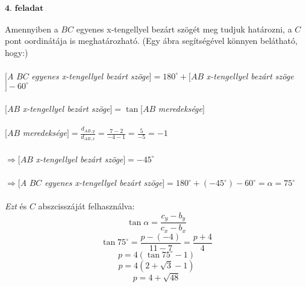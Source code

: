 \documentclass[a4paper,12pt]{article}
\begin{document}
\underline{\textit{$\textbf{4. feladat} $}}
\\
\\ Amennyiben a $BC$ egyenes x-tengellyel bezárt szögét meg tudjuk határozni, a $C$ pont oordinátája is meghatározható. (Egy ábra segítségével könnyen belátható, hogy:)
\\
\\ $[$\textit{A} $BC$ \textit{egyenes x-tengellyel bezárt szöge}$] = 180^{\circ} + [AB$ \textit{x-tengellyel bezárt szöge}$] - 60^{\circ}$
\\
\\ $[AB$ \textit{x-tengellyel bezárt szöge}$] = \tan{}[AB$ \textit{meredeksége}$]$
\\
\\ $[AB$ \textit{meredeksége}$] = \frac{d_{AB,y}}{d_{AB,x}} = \frac{7 - 2}{-4 - 1} = \frac{5}{-5} = -1 $
\\
\\ $\Rightarrow [AB$ \textit{x-tengellyel bezárt szöge}$] = -45^{\circ} $
\\
\\ \indent \indent $\Rightarrow [$\textit{A} $BC$ \textit{egyenes x-tengellyel bezárt szöge}$] = 180^{\circ} + (-45^{\circ}) - 60^{\circ} = \alpha = 75^{\circ} $ 
\\
\\ \textit{Ezt} és $C$ abszcisszáját felhasználva:
$$\tan{\alpha} = \frac{c_y - b_y}{c_x - b_x}$$
$$\tan{75^\circ} = \frac{p - (-4)}{11 - 7} = \frac{p + 4}{4}$$
$$p = 4(\tan{75^\circ}-1)$$
$$p = 4(2+\sqrt{3}-1)$$
$$p = 4 + \sqrt{48}$$
\end{document}
